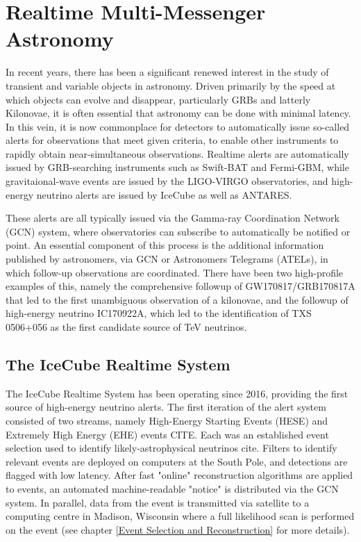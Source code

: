 \setchapterpreamble[u]{\margintoc}
\chapter{Realtime Multi-Messenger Astronomy}

In recent years, there has been a significant renewed interest in the study of transient and variable objects in astronomy. Driven primarily by the speed at which objects can evolve and disappear, particularly GRBs and latterly Kilonovae, it is often essential that astronomy can be done with minimal latency. In this vein, it is now commonplace for detectors to automatically issue so-called alerts for observations that meet given criteria, to enable other instruments to rapidly obtain near-simultaneous observations. Realtime alerts are automatically issued by GRB-searching instruments such as Swift-BAT and Fermi-GBM, while gravitaional-wave events are issued by the LIGO-VIRGO observatories, and high-energy neutrino alerts are issued by IceCube as well as ANTARES.

These alerts are all typically issued via  the Gamma-ray Coordination Network (GCN) system, where observatories can subscribe to automatically be notified or point.  An essential component of this process is the additional information published by astronomers, via GCN or Astronomers Telegrams (ATELs), in which follow-up observations are coordinated. There have been two high-profile examples of this, namely the comprehensive followup of GW170817/GRB170817A that led to the first unambiguous observation of a kilonovae, and the followup of high-energy neutrino IC170922A, which led to the identification of TXS 0506+056 as the first candidate source of TeV neutrinos. 

\section{The IceCube Realtime System}
The IceCube Realtime System has been operating since 2016, providing the first source of high-energy neutrino alerts. The first iteration of the alert system consisted of two streams, namely High-Energy Starting Events (HESE) and Extremely High Energy (EHE) events CITE. Each was an established event selection used to identify likely-astrophysical neutrinos cite. Filters to identify relevant events are deployed on computers at the South Pole, and detections are flagged  with low latency. After fast "online" reconstruction algorithms are applied to events, an automated machine-readable "notice" is distributed via the GCN system. In parallel, data from the event is transmitted via satellite to a computing centre in Madison, Wisconsin where a full likelihood scan is performed on the event (see chapter \ref{Event Selection and Reconstruction} for more details). 

